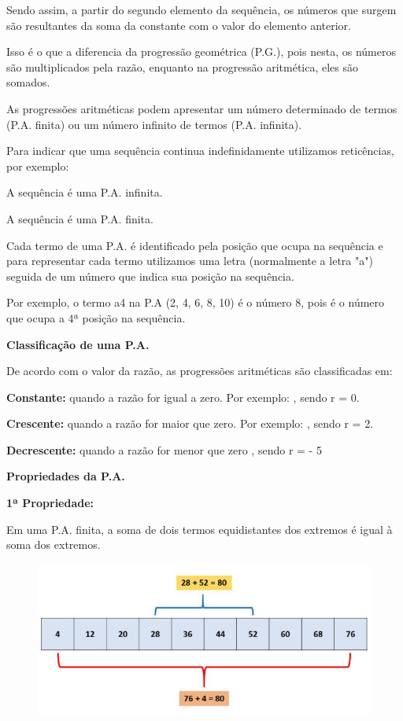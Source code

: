 \begin{multicols*}{2}
	Sendo assim, a partir do segundo elemento da sequência, os números que surgem são resultantes da soma da constante com o valor do elemento anterior.

	Isso é o que a diferencia da progressão geométrica (P.G.), pois nesta, os números são multiplicados pela razão, enquanto na progressão aritmética, eles são somados.

	As progressões aritméticas podem apresentar um número determinado de termos (P.A. finita) ou um número infinito de termos (P.A. infinita).

	Para indicar que uma sequência continua indefinidamente utilizamos reticências, por exemplo:

	A sequência  é uma P.A. infinita.

	A sequência  é uma P.A. finita.

	Cada termo de uma P.A. é identificado pela posição que ocupa na sequência e para representar cada termo utilizamos uma letra (normalmente a letra "a") seguida de um número que indica sua posição na sequência.

	Por exemplo, o termo a4 na P.A (2, 4, 6, 8, 10) é o número 8, pois é o número que ocupa a 4ª posição na sequência.

	\textbf{Classificação de uma P.A.}

	De acordo com o valor da razão, as progressões aritméticas são classificadas em:

	\textbf{Constante:} quando a razão for igual a zero. Por exemplo: , sendo r = 0.

	\textbf{Crescente:} quando a razão for maior que zero. Por exemplo: , sendo r = 2.

	\textbf{Decrescente:} quando a razão for menor que zero , sendo r = - 5

	\textbf{Propriedades da P.A.}

	\textbf{1ª Propriedade:}

	Em uma P.A. finita, a soma de dois termos equidistantes dos extremos é igual à soma dos extremos.

	\begin{figure}
		\centering
		\includegraphics[width=\columnwidth]{assets/papropriedade1.jpg}
	\end{figure}


\end{multicols*}
